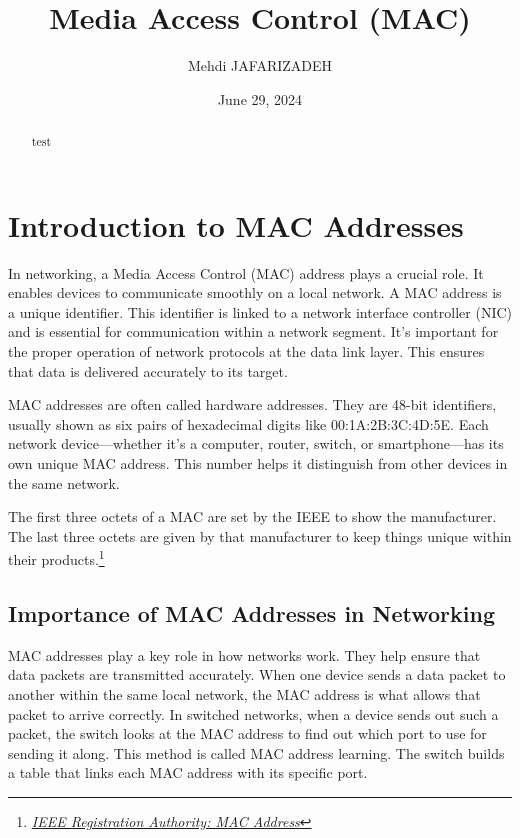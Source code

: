 \documentclass[11pt,a4paper]{article}
\title{Media Access Control (MAC)}
\author{Mehdi JAFARIZADEH}
\date{June 29, 2024}
\begin{document}
\maketitle

\begin{abstract}
    test
\end{abstract}


\section*{Introduction to MAC Addresses}
In networking, a Media Access Control (MAC) address plays a crucial role. It enables devices to communicate smoothly on a local network. A MAC address is a unique identifier. This identifier is linked to a network interface controller (NIC) and is essential for communication within a network segment. It’s important for the proper operation of network protocols at the data link layer. This ensures that data is delivered accurately to its target.

MAC addresses are often called hardware addresses. They are 48-bit identifiers, usually shown as six pairs of hexadecimal digits like 00:1A:2B:3C:4D:5E. Each network device—whether it's a computer, router, switch, or smartphone—has its own unique MAC address. This number helps it distinguish from other devices in the same network.

The first three octets of a MAC are set by the IEEE to show the manufacturer. The last three octets are given by that manufacturer to keep things unique within their products.\footnote{\href{https://standards.ieee.org/products-programs/regauth/}{\textit{IEEE Registration Authority: MAC Address}}}


\subsection*{Importance of MAC Addresses in Networking}

MAC addresses play a key role in how networks work. They help ensure that data packets are transmitted accurately. When one device sends a data packet to another within the same local network, the MAC address is what allows that packet to arrive correctly. In switched networks, when a device sends out such a packet, the switch looks at the MAC address to find out which port to use for sending it along. This method is called MAC address learning. The switch builds a table that links each MAC address with its specific port.
\end{document}
